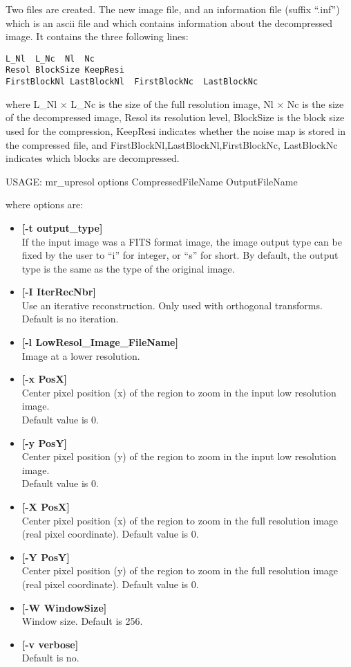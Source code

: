  Two files are created. The new image file, and an information file (suffix
``.inf'') which is an ascii file and  which contains information about  the
decompressed image. It contains the three following lines:
\begin{verbatim} 
L_Nl  L_Nc  Nl  Nc 
Resol BlockSize KeepResi 
FirstBlockNl LastBlockNl  FirstBlockNc  LastBlockNc 
\end{verbatim} 
where L\_Nl $\times$ L\_Nc is
the size of the full resolution image,  Nl $\times$ Nc is the size of 
the decompressed image, Resol its resolution level, BlockSize is the block size
used for the compression,  KeepResi indicates whether the noise map is stored
in the compressed file, and FirstBlockNl,LastBlockNl,FirstBlockNc, LastBlockNc
indicates which blocks are decompressed.  
{\bf 
\begin{center} 
USAGE: mr\_upresol options CompressedFileName OutputFileName 
\end{center}}
where options are:
\begin{itemize}
\baselineskip=0.4truecm
\item {\bf [-t output\_type]} \\ 
If the input image was a FITS format image, the image 
output type can be fixed  by the user to ``i'' for integer, or ``s'' 
for short. 
By default, the output type  is the same as the type of the original image. 
\item {\bf [-I IterRecNbr]} \\
Use an iterative reconstruction. Only used with orthogonal transforms.
Default is no iteration. 
\item {\bf [-l LowResol\_Image\_FileName]} \\ 
Image at a lower resolution. 
\item {\bf [-x PosX]} \\ 
Center pixel position (x) of the region to zoom 
in the input low resolution image. \\
Default value is 0.
\item {\bf [-y PosY]} \\ 
Center pixel position (y) of the region to zoom 
in the input low resolution image. \\
Default value is 0.
\item {\bf [-X PosX]} \\ 
Center pixel position (x) of the region to zoom 
in the full resolution image (real pixel coordinate). Default value is 0.
\item {\bf [-Y PosY]} \\ 
 Center pixel position (y) of the region to zoom 
 in the full resolution image (real pixel coordinate).
 Default value is 0.
\item {\bf  [-W WindowSize]} \\ 
 Window size. Default is 256.
\item {\bf [-v verbose]} \\ 
Default is no. 
\end{itemize}
